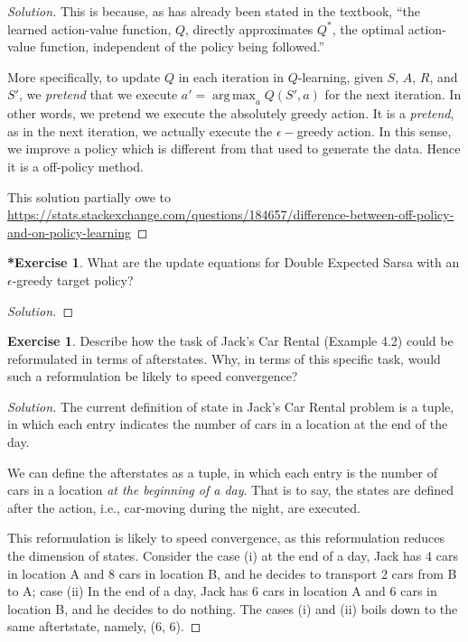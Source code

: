 \documentclass[oneside,11pt]{article}
\theoremstyle{definition}
\newtheorem{exer}[thm]{Exercise}
\newtheorem{exerstar}[thm]{*Exercise}
\DeclareMathOperator*{\argmax}{arg\,max}
\newenvironment{solution}
{\renewcommand\qedsymbol{$\blacksquare$}\begin{proof}[Solution]} {\end{proof}}
\begin{document}
\begin{shaded}
\begin{solution} 
This is because, as has already been stated in the textbook, ``the learned action-value function, $Q$, directly approximates $Q^{\ast}$, the optimal action-value function, independent of the policy being followed.'' 

More specifically, to update $Q$ in each iteration in $Q$-learning, given $S$, $A$, $R$, and $S'$, we \emph{pretend} that we execute $a' = \argmax_a Q(S', a)$ for the next iteration. In other words, we pretend we execute the absolutely greedy action. It is a \emph{pretend}, as in the next iteration, we actually execute the $\epsilon-$greedy action. In this sense, we improve a policy which is different from that used to generate the data. Hence it is a off-policy method.

This solution partially owe to \url{https://stats.stackexchange.com/questions/184657/difference-between-off-policy-and-on-policy-learning}

\end{solution} 
\end{shaded}


\begin{exerstar}
What are the update equations for Double Expected Sarsa with an $\epsilon$-greedy target policy?
\end{exerstar}

\begin{shaded}
\begin{solution} 


\end{solution} 
\end{shaded}


\begin{exer}
Describe how the task of Jack's Car Rental (Example 4.2) could be reformulated in terms of afterstates. Why, in terms of this specific task, would such a reformulation be likely to speed convergence?
\end{exer}

\begin{shaded}
\begin{solution} 
The current definition of state in Jack's Car Rental problem is a tuple, in which each entry indicates the number of cars in a location at the end of the day. 

We can define the afterstates as a tuple, in which each entry is the number of cars in a location \emph{at the beginning of a day}. That is to say, the states are defined after the action, i.e., car-moving during the night, are executed.

This reformulation is likely to speed convergence, as this reformulation reduces the dimension of states. Consider the case (i) at the end of a day, Jack has 4 cars in location A and 8 cars in location B, and he decides to transport 2 cars from B to A; case (ii) In the end of a day, Jack has 6 cars in location A and 6 cars in location B, and he decides to do nothing. The cases (i) and (ii) boils down to the same aftertstate, namely, (6, 6).

\end{solution} 
\end{shaded}
\end{document}
